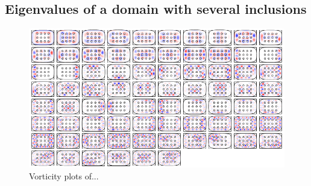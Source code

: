 %


\subsection{Eigenvalues of a domain with several inclusions}

\begin{figure}
  \centering
  \includegraphics[width=\textwidth]{fig/many_inclusions_gallery}
  \caption{Vorticity plots of...}
  \label{fig:many_inclusions_gallery}
\end{figure}

